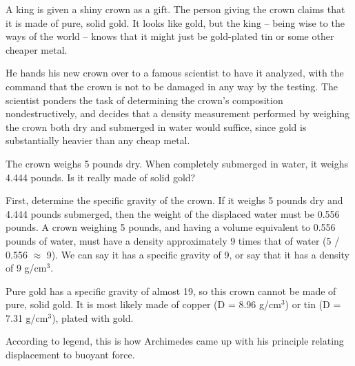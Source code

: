 

A king is given a shiny crown as a gift.  The person giving the crown claims that it is made of pure, solid gold.  It looks like gold, but the king -- being wise to the ways of the world -- knows that it might just be gold-plated tin or some other cheaper metal.

He hands his new crown over to a famous scientist to have it analyzed, with the command that the crown is not to be damaged in any way by the testing.  The scientist ponders the task of determining the crown's composition nondestructively, and decides that a density measurement performed by weighing the crown both dry and submerged in water would suffice, since gold is substantially heavier than any cheap metal.

The crown weighs 5 pounds dry.  When completely submerged in water, it weighs 4.444 pounds.  Is it really made of solid gold?







First, determine the specific gravity of the crown.  If it weighs 5 pounds dry and 4.444 pounds submerged, then the weight of the displaced water must be 0.556 pounds.  A crown weighing 5 pounds, and having a volume equivalent to 0.556 pounds of water, must have a density approximately 9 times that of water (5 / 0.556 $\approx$ 9).  We can say it has a specific gravity of 9, or say that it has a density of 9 g/cm$^{3}$.

Pure gold has a specific gravity of almost 19, so this crown cannot be made of pure, solid gold.  It is most likely made of copper (D = 8.96 g/cm$^{3}$) or tin (D = 7.31 g/cm$^{3}$), plated with gold.

\vskip 10pt

According to legend, this is how Archimedes came up with his principle relating displacement to buoyant force.











